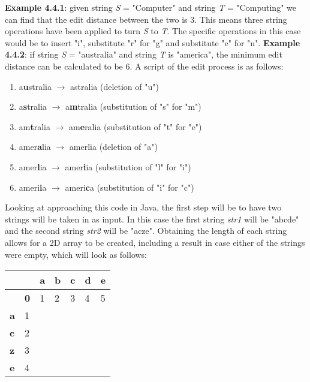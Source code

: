 \medbreak
\textbf{Example 4.4.1}: given string \textit{S} = "Computer" and string \textit{T} = "Computing" we can find that the edit distance between the two is 3. This means three string operations have been applied to turn \textit{S} to \textit{T}. The specific operations in this case would be to insert "i", substitute "r" for "g" and substitute "e" for "n".
\smallbreak
\textbf{Example 4.4.2}: if string \textit{S} = "australia" and string \textit{T} is "america", the minimum edit distance can be calculated to be 6. A script of the edit process is as follows:
\begin{enumerate}[noitemsep]
	\item a\textbf{u}stralia $\rightarrow$ astralia (deletion of "u")
	\item a\textbf{s}tralia $\rightarrow$ a\textbf{m}tralia (substitution of "s" for "m")
	\item am\textbf{t}ralia $\rightarrow$ am\textbf{e}ralia (substitution of "t" for "e")
	\item amer\textbf{a}lia $\rightarrow$ amerlia (deletion of "a")
	\item amer\textbf{l}ia $\rightarrow$ amer\textbf{i}ia (substitution of "l" for "i")
	\item ameri\textbf{i}a $\rightarrow$ ameri\textbf{c}a (substitution of "i" for "c")
\end{enumerate}

\medbreak\noindent
Looking at approaching this code in Java, the first step will be to have two strings will be taken in as input. In this case the first string \textit{str1} will be "abcde" and the second string \textit{str2} will be "acze". Obtaining the length of each string allows for a 2D array to be created, including a result in case either of the strings were empty, which will look as follows:
\begin{table}[h]
	\centering
	\begin{tabular}{|l|l|l|l|l|l|l|}
		\hline
		&  & \textbf{a} & \textbf{b} & \textbf{c} & \textbf{d} & \textbf{e} \\ \hline
		\textbf{} & \textbf{0} & 1 & 2 & 3 & 4 & 5 \\ \hline
		\textbf{a} & 1 &  &  &  &  &  \\ \hline
		\textbf{c} & 2 &  &  &  &  &  \\ \hline
		\textbf{z} & 3 &  &  &  &  &  \\ \hline
		\textbf{e} & 4 &  &  &  &  &  \\ \hline
	\end{tabular}
\end{table}

